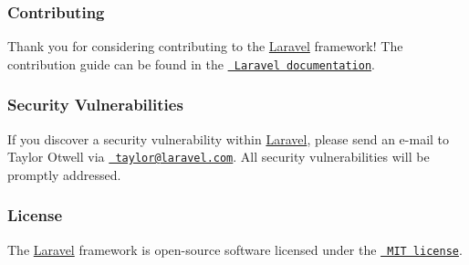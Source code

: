 \subsubsection*{Contributing}

Thank you for considering contributing to the \mbox{\hyperlink{a00008}{Laravel}} framework! The contribution guide can be found in the \href{https://laravel.com/docs/contributions}{\texttt{ Laravel documentation}}.

\subsubsection*{Security Vulnerabilities}

If you discover a security vulnerability within \mbox{\hyperlink{a00008}{Laravel}}, please send an e-\/mail to Taylor Otwell via \href{mailto:taylor@laravel.com}{\texttt{ taylor@laravel.\+com}}. All security vulnerabilities will be promptly addressed.

\subsubsection*{License}

The \mbox{\hyperlink{a00008}{Laravel}} framework is open-\/source software licensed under the \href{https://opensource.org/licenses/MIT}{\texttt{ M\+IT license}}. 